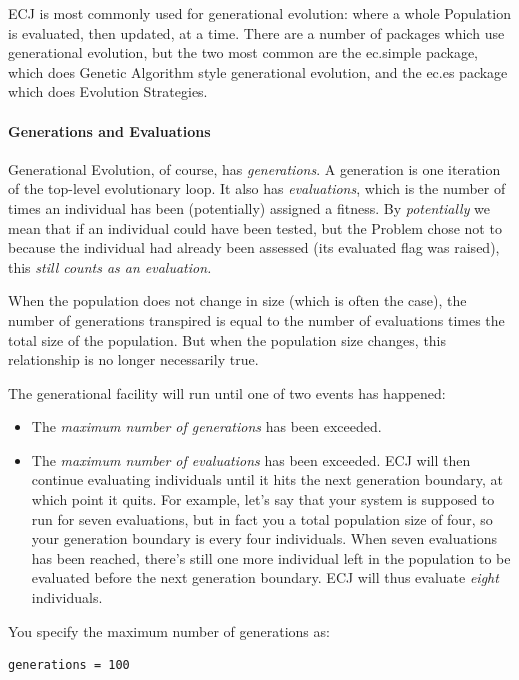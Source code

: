 \documentclass[twoside,10pt]{book}
\newcommand\variable[1]{\index{#1}\textsf{#1}}
\newcommand\package[1]{\index{#1}\textsf{#1}}
\begin{document}
ECJ is most commonly used for generational evolution: where a whole Population is evaluated, then updated, at a time.  There are a number of packages which use generational evolution, but the two most common are the \package{ec.simple} package, which does Genetic Algorithm style generational evolution, and the \package{ec.es} package which does Evolution Strategies.

\paragraph{Generations and Evaluations}

Generational Evolution, of course, has {\it generations}.  A generation is one iteration of the top-level evolutionary loop.  It also has {\it evaluations}, which is the number of times an individual has been (potentially) assigned a fitness.  By {\it potentially} we mean that if an individual could have been tested, but the Problem chose not to because the individual had already been assessed (its \variable{evaluated} flag was raised), this {\it still counts as an evaluation.}

When the population does not change in size (which is often the case), the number of generations transpired is equal to the number of evaluations times the total size of the population.  But when the population size changes, this relationship is no longer necessarily true.

The generational facility will run until one of two events has happened:

\begin{itemize}
\item The {\it maximum number of generations} has been exceeded. 
\item The {\it maximum number of evaluations} has been exceeded.  ECJ will then continue evaluating individuals until it hits the next generation boundary, at which point it quits.  For example, let's say that your system is supposed to run for seven evaluations, but in fact you a total population size of four, so your generation boundary is every four individuals.  When seven evaluations has been reached, there's still one more individual left in the population to be evaluated before the next generation boundary.  ECJ will thus evaluate {\it eight} individuals.  
\end{itemize}

You specify the maximum number of generations as:

\begin{verbatim}
generations = 100
\end{verbatim}
\end{document}
